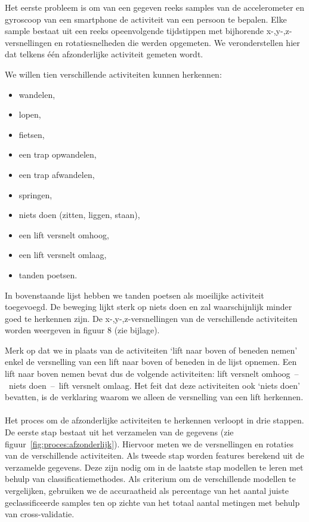 \documentclass{article}
\begin{document}
Het eerste probleem is om van een gegeven reeks samples van de accelerometer en gyroscoop van een smartphone de activiteit van een persoon te bepalen. Elke sample bestaat uit een reeks opeenvolgende tijdstippen met bijhorende x-,y-,z-versnellingen en rotatiesnelheden die werden opgemeten. We veronderstellen hier dat telkens \'e\'en afzonderlijke activiteit gemeten wordt.

We willen tien verschillende activiteiten kunnen herkennen:
\begin{itemize}
\item wandelen,
\item lopen,
\item fietsen,
\item een trap opwandelen,
\item een trap afwandelen,
\item springen,
\item niets doen (zitten, liggen, staan),
\item een lift versnelt omhoog,
\item een lift versnelt omlaag,
\item tanden poetsen.
\end{itemize}

In bovenstaande lijst hebben we tanden poetsen als moeilijke activiteit toegevoegd. De beweging lijkt sterk op niets doen en zal waarschijnlijk minder goed te herkennen zijn. De x-,y-,z-versnellingen van de verschillende activiteiten worden weergeven in figuur 8 (zie bijlage).

Merk op dat we in plaats van de activiteiten `lift naar boven of beneden nemen' enkel de versnelling van een lift naar boven of beneden in de lijst opnemen. Een lift naar boven nemen bevat dus de volgende activiteiten: lift versnelt omhoog~--~niets doen~--~lift versnelt omlaag. Het feit dat deze activiteiten ook `niets doen' bevatten, is de verklaring waarom we alleen de versnelling van een lift herkennen.
\\~\\
Het proces om de afzonderlijke activiteiten te herkennen verloopt in drie stappen. De eerste stap bestaat uit het verzamelen van de gegevens (zie figuur~\ref{fig:proces:afzonderlijk}). Hiervoor meten we de versnellingen en rotaties van de verschillende activiteiten. Als tweede stap worden features berekend uit de verzamelde gegevens. Deze zijn nodig om in de laatste stap modellen te leren met behulp van classificatiemethodes. Als criterium om de verschillende modellen te vergelijken, gebruiken we de accuraatheid als percentage van het aantal juiste geclassificeerde samples ten op zichte van het totaal aantal metingen met behulp van cross-validatie.
\end{document}
